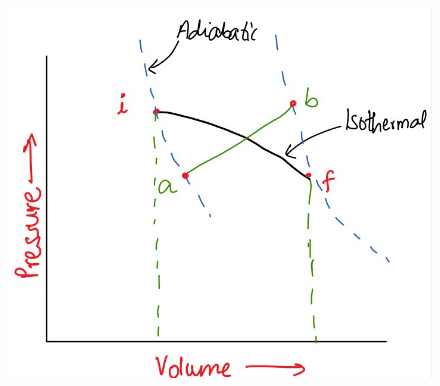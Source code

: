 \documentclass[12pt]{article}
\begin{document}
\begin{figure}
	\includegraphics[scale=0.6]{clausius.jpg}
	\centering
\end{figure}
\end{document}

